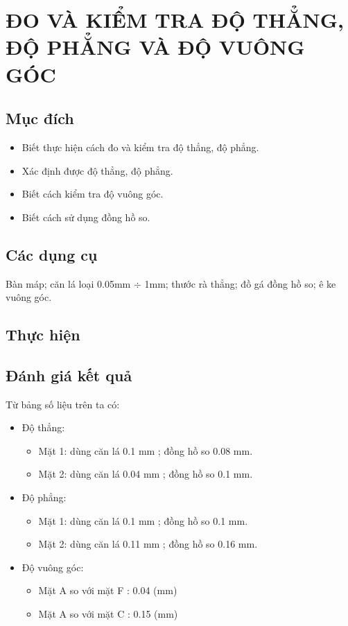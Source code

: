 \chapter{ĐO VÀ KIỂM TRA ĐỘ THẲNG, ĐỘ PHẲNG VÀ ĐỘ VUÔNG GÓC}
\section{Mục đích}
\begin{itemize}
	\item Biết thực hiện cách đo và kiểm tra độ thẳng, độ phẳng.
	\item Xác định được độ thẳng, độ phẳng.
	\item Biết cách kiểm tra độ vuông góc.
	\item Biết cách sử dụng đồng hồ so.
\end{itemize}

\section{Các dụng cụ}
Bàn máp; căn lá loại 0.05mm $ \div $ 1mm; thước rà thẳng; đồ gá đồng hồ so; ê ke vuông góc.

\section{Thực hiện}

\section{Đánh giá kết quả}
Từ bảng số liệu trên ta có:

\begin{itemize}
	\item Độ thẳng:
	\begin{itemize}
		\item Mặt 1: dùng căn lá 0.1 mm ; đồng hồ so 0.08 mm.
		\item Mặt 2: dùng căn lá 0.04 mm ; đồng hồ so 0.1 mm.
	\end{itemize}
	\item Độ phẳng:
	\begin{itemize}
		\item Mặt 1: dùng căn lá 0.1 mm ; đồng hồ so 0.1 mm.
		\item Mặt 2: dùng căn lá 0.11 mm ; đồng hồ so 0.16 mm.
	\end{itemize}
	\item Độ vuông góc:
	\begin{itemize}
		\item Mặt A so với mặt F : 0.04 (mm)
		\item Mặt A so với mặt C : 0.15 (mm)
	\end{itemize}
\end{itemize}

